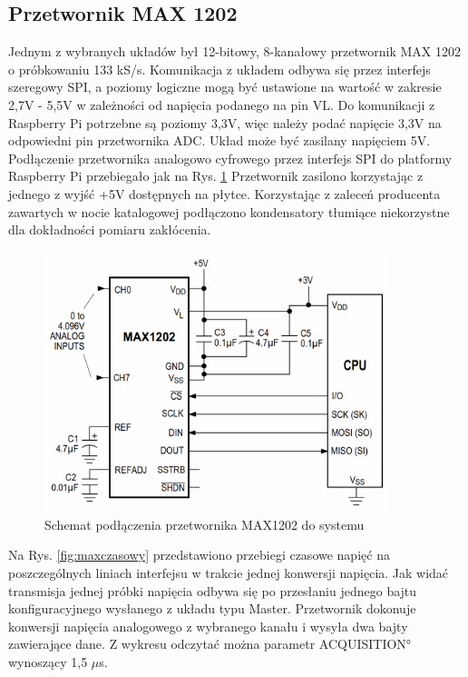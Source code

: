\subsection{Przetwornik MAX 1202}

Jednym z wybranych układów był 12-bitowy, 8-kanałowy przetwornik MAX 1202 o próbkowaniu 133 kS/s. Komunikacja z układem odbywa się przez interfejs szeregowy SPI, a poziomy logiczne mogą być ustawione na wartość w zakresie 2,7V - 5,5V w zależności od napięcia podanego na pin VL. Do komunikacji z Raspberry Pi potrzebne są poziomy 3,3V, więc należy podać napięcie 3,3V na odpowiedni pin przetwornika ADC. Układ może być zasilany napięciem 5V.
Podłączenie przetwornika analogowo cyfrowego przez interfejs SPI do platformy Raspberry Pi przebiegało jak na Rys. \ref{fig:maxandrpi} Przetwornik zasilono korzystając z jednego z wyjść +5V dostępnych na płytce. Korzystając z zaleceń producenta zawartych w nocie katalogowej \cite{maxdatasheet} podłączono kondensatory tłumiące niekorzystne dla dokładności pomiaru zakłócenia.  


\begin{figure}[h]
	\centering
		\includegraphics[width=10cm]{max1202_sch}
	\caption{Schemat podłączenia przetwornika MAX1202 do systemu} 
	\label{fig:maxandrpi}
\end{figure}

Na Rys. \ref{fig:maxczasowy} przedstawiono przebiegi czasowe napięć na poszczególnych liniach interfejsu w trakcie jednej konwersji napięcia. Jak widać transmisja jednej próbki napięcia odbywa się po przesłaniu jednego bajtu konfiguracyjnego wysłanego z układu typu Master. Przetwornik dokonuje konwersji napięcia analogowego z wybranego kanału i wysyła dwa bajty zawierające dane. Z wykresu odczytać można parametr \ang{ACQUISITION} wynoszący 1,5 $\mu$s. 



